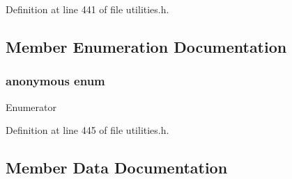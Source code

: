 Definition at line 441 of file utilities.\+h.



\subsection{Member Enumeration Documentation}
\hypertarget{structcrap_1_1limits_3_01float32__t_01_4_ad5de71d4ee81c3eceec75539be94573c}{}\subsubsection[{anonymous enum}]{\setlength{\rightskip}{0pt plus 5cm}anonymous enum}\label{structcrap_1_1limits_3_01float32__t_01_4_ad5de71d4ee81c3eceec75539be94573c}
\begin{Desc}
\item[Enumerator]\par
\begin{description}
\item[{\em 
\hypertarget{structcrap_1_1limits_3_01float32__t_01_4_ad5de71d4ee81c3eceec75539be94573ca265f695521ee2758dc5962bcf67eee01}{}I\+S\+\_\+\+I\+N\+T\label{structcrap_1_1limits_3_01float32__t_01_4_ad5de71d4ee81c3eceec75539be94573ca265f695521ee2758dc5962bcf67eee01}
}]\item[{\em 
\hypertarget{structcrap_1_1limits_3_01float32__t_01_4_ad5de71d4ee81c3eceec75539be94573ca80ccf0f70edfd05b157876672cb4cc0d}{}I\+S\+\_\+\+S\+I\+G\+N\+E\+D\label{structcrap_1_1limits_3_01float32__t_01_4_ad5de71d4ee81c3eceec75539be94573ca80ccf0f70edfd05b157876672cb4cc0d}
}]\end{description}
\end{Desc}


Definition at line 445 of file utilities.\+h.



\subsection{Member Data Documentation}
\hypertarget{structcrap_1_1limits_3_01float32__t_01_4_a8487cda6ada7d746f8c0318dfd2fd046}{}
